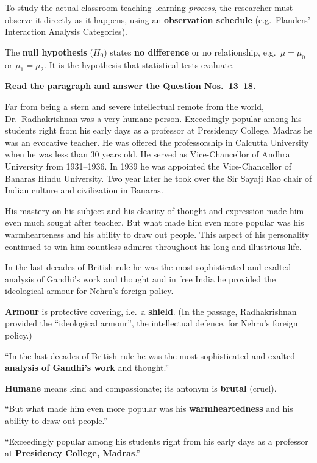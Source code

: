 To study the actual classroom teaching--learning \emph{process}, the researcher must observe it directly as it happens, using an \textbf{observation schedule} (e.g.\ Flanders' Interaction Analysis Categories).

The \textbf{null hypothesis} ($H_0$) states \textbf{no difference} or no relationship, e.g.\ $\mu=\mu_0$ or $\mu_1=\mu_2$. It is the hypothesis that statistical tests evaluate.

\textbf{Read the paragraph and answer the Question Nos.~13--18.}\par\smallskip
Far from being a stern and severe intellectual remote from the world, Dr.~Radhakrishnan was a very humane person. Exceedingly popular among his students right from his early days as a professor at Presidency College, Madras he was an evocative teacher. He was offered the professorship in Calcutta University when he was less than 30 years old. He served as Vice-Chancellor of Andhra University from 1931--1936. In 1939 he was appointed the Vice-Chancellor of Banaras Hindu University. Two year later he took over the Sir Sayaji Rao chair of Indian culture and civilization in Banaras.

His mastery on his subject and his clearity of thought and expression made him even much sought after teacher. But what made him even more popular was his warmhearteness and his ability to draw out people. This aspect of his personality continued to win him countless admires throughout his long and illustrious life.

In the last decades of British rule he was the most sophisticated and exalted analysis of Gandhi's work and thought and in free India he provided the ideological armour for Nehru's foreign policy.

\textbf{Armour} is protective covering, i.e.\ a \textbf{shield}. (In the passage, Radhakrishnan provided the ``ideological armour'', the intellectual defence, for Nehru's foreign policy.)

``In the last decades of British rule he was the most sophisticated and exalted \textbf{analysis of Gandhi's work} and thought.''

\textbf{Humane} means kind and compassionate; its antonym is \textbf{brutal} (cruel).

``But what made him even more popular was his \textbf{warmheartedness} and his ability to draw out people.''

``Exceedingly popular among his students right from his early days as a professor at \textbf{Presidency College, Madras}.''

